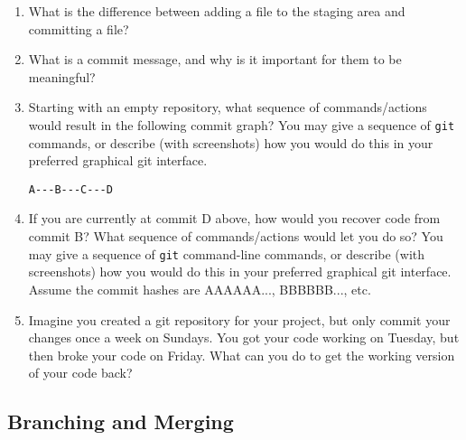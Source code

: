 \documentclass[10pt,twocolumn]{article}
\begin{document}
\begin{enumerate}
\item What is the difference between adding a file to the staging area and committing a file?
\item What is a commit message, and why is it important for them to be meaningful?
\item Starting with an empty repository, what sequence of commands/actions would result in the following commit graph? You may give a sequence of \texttt{git} commands, or describe (with screenshots) how you would do this in your preferred graphical git interface.
\begin{verbatim}
A---B---C---D
\end{verbatim}
\item If you are currently at commit D above, how would you recover code from commit B? What sequence of commands/actions would let you do so? You may give a sequence of \texttt{git} command-line commands, or describe (with screenshots) how you would do this in your preferred graphical git interface. Assume the commit hashes are AAAAAA..., BBBBBB..., etc.
\item Imagine you created a git repository for your project, but only commit your changes once a week on Sundays. You got your code working on Tuesday, but then broke your code on Friday. What can you do to get the working version of your code back?
\end{enumerate}

\subsection{Branching and Merging}
\end{document}
